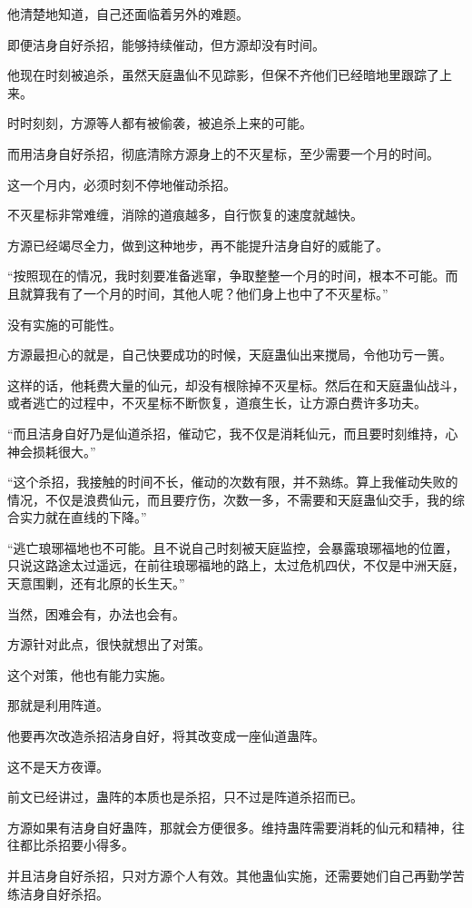 \begin{this_body}
他清楚地知道，自己还面临着另外的难题。

即便洁身自好杀招，能够持续催动，但方源却没有时间。

他现在时刻被追杀，虽然天庭蛊仙不见踪影，但保不齐他们已经暗地里跟踪了上来。

时时刻刻，方源等人都有被偷袭，被追杀上来的可能。

而用洁身自好杀招，彻底清除方源身上的不灭星标，至少需要一个月的时间。

这一个月内，必须时刻不停地催动杀招。

不灭星标非常难缠，消除的道痕越多，自行恢复的速度就越快。

方源已经竭尽全力，做到这种地步，再不能提升洁身自好的威能了。

“按照现在的情况，我时刻要准备逃窜，争取整整一个月的时间，根本不可能。而且就算我有了一个月的时间，其他人呢？他们身上也中了不灭星标。”

没有实施的可能性。

方源最担心的就是，自己快要成功的时候，天庭蛊仙出来搅局，令他功亏一篑。

这样的话，他耗费大量的仙元，却没有根除掉不灭星标。然后在和天庭蛊仙战斗，或者逃亡的过程中，不灭星标不断恢复，道痕生长，让方源白费许多功夫。

“而且洁身自好乃是仙道杀招，催动它，我不仅是消耗仙元，而且要时刻维持，心神会损耗很大。”

“这个杀招，我接触的时间不长，催动的次数有限，并不熟练。算上我催动失败的情况，不仅是浪费仙元，而且要疗伤，次数一多，不需要和天庭蛊仙交手，我的综合实力就在直线的下降。”

“逃亡琅琊福地也不可能。且不说自己时刻被天庭监控，会暴露琅琊福地的位置，只说这路途太过遥远，在前往琅琊福地的路上，太过危机四伏，不仅是中洲天庭，天意围剿，还有北原的长生天。”

当然，困难会有，办法也会有。

方源针对此点，很快就想出了对策。

这个对策，他也有能力实施。

那就是利用阵道。

他要再次改造杀招洁身自好，将其改变成一座仙道蛊阵。

这不是天方夜谭。

前文已经讲过，蛊阵的本质也是杀招，只不过是阵道杀招而已。

方源如果有洁身自好蛊阵，那就会方便很多。维持蛊阵需要消耗的仙元和精神，往往都比杀招要小得多。

并且洁身自好杀招，只对方源个人有效。其他蛊仙实施，还需要她们自己再勤学苦练洁身自好杀招。


\end{this_body}
